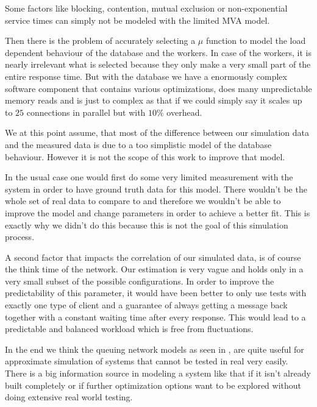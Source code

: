 \documentclass[a4paper, oneside]{csthesis}
\begin{document}
    Some factors like blocking, contention, mutual exclusion or
    non-exponential service times can simply not be modeled with the limited MVA
    model. 
    
    Then there is the problem of accurately selecting a $\mu$ function to
    model the load dependent behaviour of the database and the workers. In case
    of the workers, it is nearly irrelevant what is selected because they only
    make a very small part of the entire response time. But with the database we
    have a enormously complex software component that contains various
    optimizations, does many unpredictable memory reads and is just to complex
    as that if we could simply say it scales up to $25$ connections in parallel
    but with $10 \%$ overhead.
    
    We at this point assume, that most of the difference between our simulation
    data and the measured data is due to a too simplistic model of the database
    behaviour. However it is not the scope of this work to improve that model.
    
    In the usual case one would first do some very limited measurement with the
    system in order to have ground truth data for this model. There wouldn't be
    the whole set of real data to compare to and therefore we wouldn't be able
    to improve the model and change parameters in order to achieve a better fit.
    This is exactly why we didn't do this because this is not the goal of this
    simulation process.
    
    A second factor that impacts the correlation of our simulated data, is of
    course the think time of the network. Our estimation is very vague and holds
    only in a very small subset of the possible configurations. In order to
    improve the predictability of this parameter, it would have been better to
    only use \telesto{} tests with exactly one type of client and a guarantee of
    always getting a message back together with a constant waiting time after
    every response. This would lead to a predictable and balanced workload which
    is free from fluctuations.
 
    In the end we think the queuing network models as seen in
    \cite{jain2008art}, are quite useful for approximate simulation of systems
    that cannot be tested in real very easily. There is a big information source
    in modeling a system like that if it isn't already built completely or if
    further optimization options want to be explored without doing extensive
    real world testing.
\end{document}
